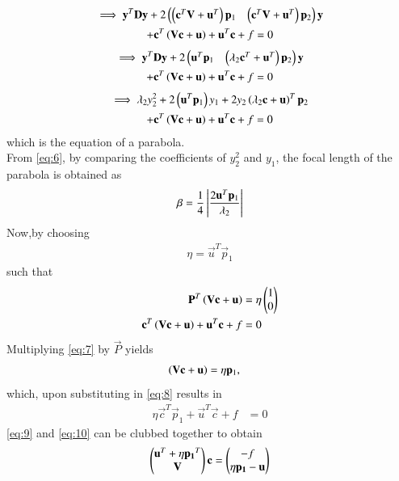 \documentclass[journal,12pt,twocolumn]{IEEEtran}
\begin{document}
\begin{multline}
\implies
\mathbf{y}^T\mathbf{D}\mathbf{y}+2\begin{pmatrix}\left(\mathbf{c}^T\mathbf{V}+\mathbf{u}^T\right)\mathbf{p}_1 & \left(\mathbf{c}^T\mathbf{V}+\mathbf{u}^T\right)\mathbf{p}_2\end{pmatrix}\mathbf{y}
\\
+  \mathbf{c}^T\left(\mathbf{V}\mathbf{c} + \mathbf{u}\right)+ \mathbf{u}^T\mathbf{c} + f= 0
\end{multline}
\begin{multline}
\implies \mathbf{y}^T\mathbf{D}\mathbf{y}+2\begin{pmatrix}\mathbf{u}^T\mathbf{p}_1 & \left(\lambda_2\mathbf{c}^T+\mathbf{u}^T\right)\mathbf{p}_2\end{pmatrix}\mathbf{y}
\\
+  \mathbf{c}^T\left(\mathbf{V}\mathbf{c} + \mathbf{u}\right)+ \mathbf{u}^T\mathbf{c} + f= 0
\end{multline}
\begin{multline}
\implies \lambda_2y_2^2+2\left(\mathbf{u}^T\mathbf{p}_1\right)y_1+  2y_2\left(\lambda_2\mathbf{c}+\mathbf{u}\right)^T\mathbf{p}_2
\\
+  \mathbf{c}^T\left(\mathbf{V}\mathbf{c} + \mathbf{u}\right)+ \mathbf{u}^T\mathbf{c} + f= 0\label{eq:6}
\end{multline}
which is the equation of a parabola.
\\
From \eqref{eq:6}, by comparing the coefficients of $y_2^2$ and $y_1$, the focal length of the parabola is obtained as 
\begin{align}
\beta = \frac{1}{4}\left\vert\frac{2\mathbf{u}^T\mathbf{p}_1}{\lambda_2}\right\vert 
\label{eq:16} 
\end{align}
Now,by choosing
\begin{align}
\eta = \vec{u}^T\vec{p}_1
\end{align}
such that
\begin{align}
\label{eq:7}
\mathbf{P}^{T}\left(\mathbf{V}\mathbf{c}+\mathbf{u}\right) &= \eta\begin{pmatrix}1\\0\end{pmatrix}
\\
\mathbf{c}^T\left(\mathbf{V}\mathbf{c} + \mathbf{u}\right)+ \mathbf{u}^T\mathbf{c} + f&= 0
\label{eq:8}
\end{align}
Multiplying \eqref{eq:7} by $\vec{P}$ yields
\begin{align}
\label{eq:9}
\left(\mathbf{V}\mathbf{c}+\mathbf{u}\right) &= \eta\mathbf{p}_1,
\end{align}
which, upon substituting in \eqref{eq:8}
results in 
\begin{align}
\eta\vec{c}^T\vec{p}_1 + \vec{u}^T\vec{c} + f&= 0
\label{eq:10}
\end{align}
\eqref{eq:9} and \eqref{eq:10} can be clubbed together to obtain 
\begin{align}
\begin{pmatrix}\mathbf{u}^T + \eta\mathbf{p_1}^T \\ \mathbf{V}\end{pmatrix}\mathbf{c} = \begin{pmatrix}-f \\ \eta\mathbf{p_1} - \mathbf{u}\end{pmatrix} \label{eq:12}
\end{align}
\end{document}
